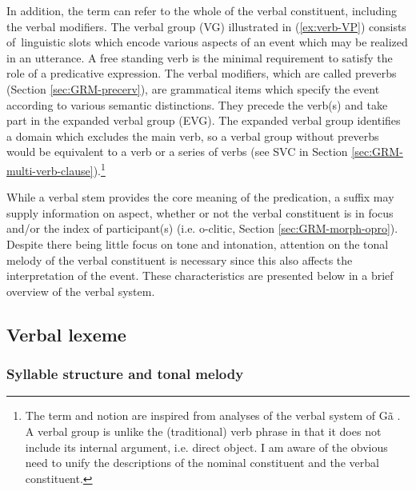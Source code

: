 \begin{exe}
\begin{exe}
\begin{exe}
{\begin{exe}
\begin{exe}
\begin{exe}
\begin{exe}
\begin{exe}
\begin{exe}
\begin{exe}
\begin{exe}
\begin{exe}
\begin{exe}
\begin{exe}
\begin{exe}
\begin{exe}
\begin{exe}
\begin{exe}
\begin{exe}
\begin{exe}
\begin{exe}
\begin{exe}
In addition, the term  can refer to the 
whole of the verbal constituent, including the verbal modifiers. The verbal 
group   (VG) illustrated in (\ref{ex:verb-VP})
consists of linguistic slots which encode   various aspects of an event  which
may be realized in an utterance. A free standing verb is the minimal requirement
to satisfy the role of a predicative expression. The verbal modifiers, which
are called preverbs (Section \ref{sec:GRM-precerv}),  are grammatical items 
which specify the event
according to various  semantic distinctions. They precede the  verb(s) and take
part in the expanded verbal group  (EVG). The 
expanded verbal group
identifies  a domain which excludes the main verb, so a  verbal group
without preverbs would  be equivalent to a verb or a series of verbs (see SVC in
Section \ref{sec:GRM-multi-verb-clause}).\footnote{The term and notion are 
inspired from
analyses of the verbal system of Gã \citep{Daku70}. A verbal group is unlike 
the
(traditional) verb phrase in that it does not include its internal argument,
i.e. direct object. I am aware of the obvious need to unify the descriptions of
the nominal constituent and the verbal constituent.} 


While a verbal stem provides the core meaning of the predication,  a suffix may 
supply information on  aspect, whether or not the verbal constituent is in 
focus 
and/or the index of participant(s) (i.e. {\sc o}-clitic, Section 
\ref{sec:GRM-morph-opro}).  Despite there being little focus on tone and 
intonation, attention on the tonal melody of the verbal constituent is 
necessary 
since this also affects the interpretation of the event. These characteristics 
are presented below in a brief overview of the verbal system. 

% 



\subsection{Verbal lexeme}
\label{sec:GRM-verb-lexeme}


\subsubsection{Syllable structure and tonal melody}
\label{sec:GRM-verb-syll-und-tone}


\end{exe}
\end{exe}
\end{exe}
\end{exe}
\end{exe}
\end{exe}
\end{exe}
\end{exe}
\end{exe}
\end{exe}
\end{exe}
\end{exe}
\end{exe}
\end{exe}
\end{exe}
\end{exe}
\end{exe}
\end{exe}
\end{exe}}
\end{exe}
\end{exe}
\end{exe}
